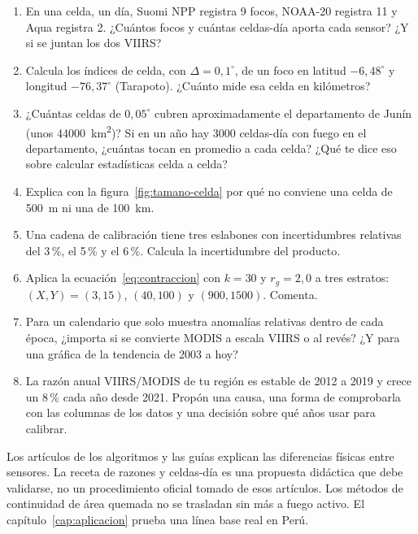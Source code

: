\ejercicios

\begin{enumerate}
  \item En una celda, un día, Suomi NPP registra 9 focos, NOAA-20 registra 11 y Aqua registra 2.
  ¿Cuántos focos y cuántas celdas-día aporta cada sensor? ¿Y si se juntan los dos VIIRS?
  \item Calcula los índices de celda, con $\Delta = 0{,}1^\circ$, de un foco en latitud
  $-6{,}48^\circ$ y longitud $-76{,}37^\circ$ (Tarapoto). ¿Cuánto mide esa celda en kilómetros?
  \item ¿Cuántas celdas de $0{,}05^\circ$ cubren aproximadamente el departamento de Junín (unos
  \SI{44000}{\kilo\metre\squared})? Si en un año hay 3000 celdas-día con fuego en el
  departamento, ¿cuántas tocan en promedio a cada celda? ¿Qué te dice eso sobre calcular
  estadísticas celda a celda?
  \item Explica con la figura~\ref{fig:tamano-celda} por qué no conviene una celda de 500~m ni
  una de 100~km.
  \item Una cadena de calibración tiene tres eslabones con incertidumbres relativas del 3\,{}\%,
  el 5\,{}\% y el 6\,{}\%. Calcula la incertidumbre del producto.
  \item Aplica la ecuación~\eqref{eq:contraccion} con $k = 30$ y $r_g = 2{,}0$ a tres estratos:
  $(X, Y) = (3, 15)$, $(40, 100)$ y $(900, 1500)$. Comenta.
  \item Para un calendario que solo muestra anomalías relativas dentro de cada época, ¿importa
  si se convierte MODIS a escala VIIRS o al revés? ¿Y para una gráfica de la tendencia de 2003 a
  hoy?
  \item La razón anual VIIRS/MODIS de tu región es estable de 2012 a 2019 y crece un 8\,{}\% cada
  año desde 2021. Propón una causa, una forma de comprobarla con las columnas de los datos y una
  decisión sobre qué años usar para calibrar.
\end{enumerate}

\lecturas

Los artículos de los algoritmos y las guías explican las diferencias físicas entre
sensores. La receta de razones y celdas-día
es una propuesta didáctica que debe validarse, no un procedimiento oficial tomado
de esos artículos. Los métodos de continuidad de área quemada no se trasladan sin
más a fuego activo. El capítulo~\ref{cap:aplicacion} prueba una línea base real en Perú.
